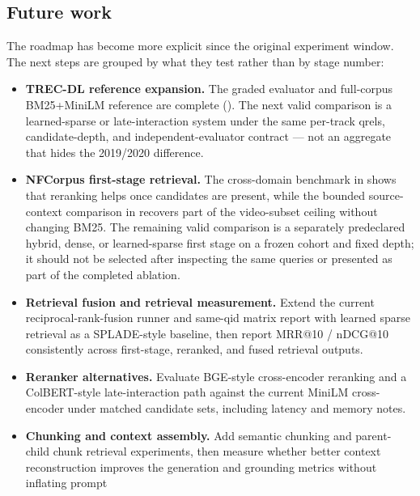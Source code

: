 \documentclass[11pt,a4paper]{article}
\makeatletter
\newcommand{\mrr}{MRR@10}
\newcommand{\ndcg}{nDCG@10}
\newcommand{\bmtwofive}{BM25}
\makeatother
\begin{document}
\subsection*{Future work}
\label{sec:future-work}

The roadmap has become more explicit since the original experiment
window.  The next steps are grouped by what they test rather than by
stage number:

\begin{itemize}
  \item \textbf{TREC-DL reference expansion.}  The graded evaluator
        and full-corpus \bmtwofive{}+MiniLM reference are complete
        ().  The next valid comparison is a
        learned-sparse or late-interaction system under the same
        per-track qrels, candidate-depth, and independent-evaluator
         contract --- not an aggregate that hides the 2019/2020
         difference.
  \item \textbf{NFCorpus first-stage retrieval.}  The cross-domain
        benchmark in  shows that reranking helps
        once candidates are present, while the bounded source-context
        comparison in  recovers part of
        the video-subset ceiling without changing \bmtwofive{}.  The
        remaining valid comparison is a separately predeclared hybrid,
        dense, or learned-sparse first stage on a frozen cohort and
        fixed depth; it should not be selected after inspecting the
        same queries or presented as part of the completed ablation.
  \item \textbf{Retrieval fusion and retrieval measurement.}
        Extend the current reciprocal-rank-fusion runner and
        same-qid matrix report with learned sparse retrieval as a
        SPLADE-style baseline, then report \mrr{} / \ndcg{}
        consistently across first-stage, reranked, and fused
        retrieval outputs.
  \item \textbf{Reranker alternatives.}  Evaluate BGE-style
        cross-encoder reranking and a ColBERT-style late-interaction
        path against the current MiniLM cross-encoder under matched
        candidate sets, including latency and memory notes.
  \item \textbf{Chunking and context assembly.}  Add semantic
        chunking and parent-child chunk retrieval experiments, then
        measure whether better context reconstruction improves the
        generation and grounding metrics without inflating prompt

\end{itemize}
\end{document}
